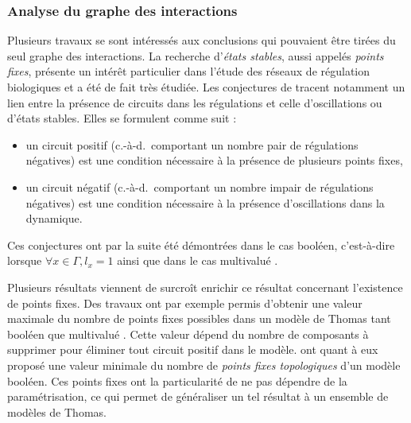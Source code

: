 \subsubsection*{Analyse du graphe des interactions}
Plusieurs travaux se sont intéressés aux conclusions qui pouvaient être
tirées du seul graphe des interactions.
La recherche d'\emph{états stables}, aussi appelés \emph{points fixes},
présente un intérêt particulier dans l'étude des réseaux de régulation biologiques
et a été de fait très étudiée.
Les conjectures de 
tracent notamment un lien entre la présence de circuits dans les régulations et celle
d'oscillations ou d'états stables.
Elles se formulent comme suit :
\begin{itemize}
  \item un circuit positif (c.-à-d.~comportant un nombre pair de régulations négatives)
    est une condition nécessaire à la présence de plusieurs points fixes,
  \item un circuit négatif (c.-à-d.~comportant un nombre impair de régulations négatives)
    est une condition nécessaire à la présence d'oscillations dans la dynamique.
\end{itemize}
Ces conjectures ont par la suite été démontrées
dans le cas booléen, c'est-à-dire lorsque $\forall x \in \Gamma, l_x = 1$
\cite{RRT08,Richard06thesis}
ainsi que dans le cas multivalué \cite{RiCo07,Richard10}.

Plusieurs résultats viennent de surcroît enrichir ce résultat concernant
l'existence de points fixes.
Des travaux ont par exemple
permis d'obtenir une valeur maximale du nombre de points fixes possibles
dans un modèle de Thomas tant booléen \cite{aracena2008maximum} que multivalué \cite{Richard09}.
Cette valeur dépend du nombre de composants à supprimer pour éliminer
tout circuit positif dans le modèle.
 ont quant à eux proposé une valeur minimale du nombre de
\emph{points fixes topologiques} d'un modèle booléen.
Ces points fixes ont la particularité de ne pas dépendre de la paramétrisation,
ce qui permet de généraliser un tel résultat à un ensemble de modèles de Thomas.

% 

